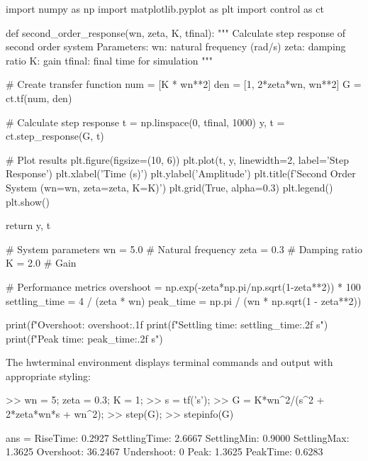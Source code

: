 \documentclass{homework}
\begin{document}


\begin{hwpython}[caption=Control Systems Analysis in Python]
import numpy as np
import matplotlib.pyplot as plt
import control as ct

def second_order_response(wn, zeta, K, tfinal):
    """
    Calculate step response of second order system
    Parameters:
        wn: natural frequency (rad/s)
        zeta: damping ratio
        K: gain
        tfinal: final time for simulation
    """
    
    # Create transfer function
    num = [K * wn**2]
    den = [1, 2*zeta*wn, wn**2]
    G = ct.tf(num, den)
    
    # Calculate step response
    t = np.linspace(0, tfinal, 1000)
    y, t = ct.step_response(G, t)
    
    # Plot results
    plt.figure(figsize=(10, 6))
    plt.plot(t, y, linewidth=2, label='Step Response')
    plt.xlabel('Time (s)')
    plt.ylabel('Amplitude')
    plt.title(f'Second Order System (wn={wn}, zeta={zeta}, K={K})')
    plt.grid(True, alpha=0.3)
    plt.legend()
    plt.show()
    
    return y, t
\end{hwpython}


\begin{hwpython}
# System parameters
wn = 5.0      # Natural frequency
zeta = 0.3    # Damping ratio  
K = 2.0       # Gain

# Performance metrics
overshoot = np.exp(-zeta*np.pi/np.sqrt(1-zeta**2)) * 100
settling_time = 4 / (zeta * wn)
peak_time = np.pi / (wn * np.sqrt(1 - zeta**2))

print(f"Overshoot: {overshoot:.1f}%
print(f"Settling time: {settling_time:.2f} s")
print(f"Peak time: {peak_time:.2f} s")
\end{hwpython}


The hwterminal environment displays terminal commands and output with appropriate styling:

\begin{hwterminal}[caption=MATLAB Simulation Output]
>> wn = 5; zeta = 0.3; K = 1;
>> s = tf('s');
>> G = K*wn^2/(s^2 + 2*zeta*wn*s + wn^2);
>> step(G);
>> stepinfo(G)

ans = 
       RiseTime: 0.2927
    SettlingTime: 2.6667
     SettlingMin: 0.9000
     SettlingMax: 1.3625
       Overshoot: 36.2467
      Undershoot: 0
            Peak: 1.3625
        PeakTime: 0.6283
\end{hwterminal}
\end{document}
